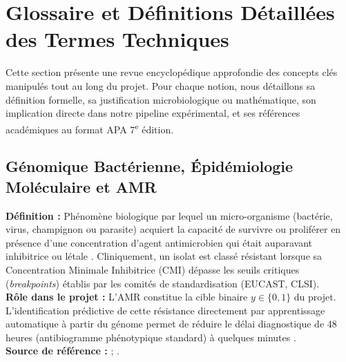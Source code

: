 \documentclass[11pt,a4paper]{article}
\begin{document}
\section{Glossaire et Définitions Détaillées des Termes Techniques}

Cette section présente une revue encyclopédique approfondie des concepts clés manipulés tout au long du projet. Pour chaque notion, nous détaillons sa définition formelle, sa justification microbiologique ou mathématique, son implication directe dans notre pipeline expérimental, et ses références académiques au format APA 7\textsuperscript{e} édition.

\subsection{Génomique Bactérienne, Épidémiologie Moléculaire et AMR}

\begin{defbox}
\textbf{Définition :} Phénomène biologique par lequel un micro-organisme (bactérie, virus, champignon ou parasite) acquiert la capacité de survivre ou proliférer en présence d'une concentration d'agent antimicrobien qui était auparavant inhibitrice ou létale \citep{who2024amr}. Cliniquement, un isolat est classé résistant lorsque sa Concentration Minimale Inhibitrice (CMI) dépasse les seuils critiques (\textit{breakpoints}) établis par les comités de standardisation (EUCAST, CLSI).\\
\textbf{Rôle dans le projet :} L'AMR constitue la cible binaire $y \in \{0, 1\}$ du projet. L'identification prédictive de cette résistance directement par apprentissage automatique à partir du génome permet de réduire le délai diagnostique de 48 heures (antibiogramme phénotypique standard) à quelques minutes \citep{anahtar2021applications,moradigaravand2018prediction}.\\
\textbf{Source de référence :} \citet{murray2022global} ; \citet{who2024amr}.
\end{defbox}
\end{document}
